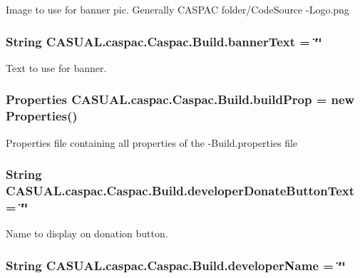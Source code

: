 Image to use for banner pic. Generally C\-A\-S\-P\-A\-C folder/\-Code\-Source -\/\-Logo.\-png \hypertarget{class_c_a_s_u_a_l_1_1caspac_1_1_caspac_1_1_build_ad52dcd748136e46978261a093f5fbb9e}{
\subsubsection[{banner\-Text}]{\setlength{\rightskip}{0pt plus 5cm}String C\-A\-S\-U\-A\-L.\-caspac.\-Caspac.\-Build.\-banner\-Text = \char`\"{}\char`\"{}}}\label{class_c_a_s_u_a_l_1_1caspac_1_1_caspac_1_1_build_ad52dcd748136e46978261a093f5fbb9e}
Text to use for banner. \hypertarget{class_c_a_s_u_a_l_1_1caspac_1_1_caspac_1_1_build_ae41e84cb3d34e8771bcbdfe5e9dbce54}{
\subsubsection[{build\-Prop}]{\setlength{\rightskip}{0pt plus 5cm}Properties C\-A\-S\-U\-A\-L.\-caspac.\-Caspac.\-Build.\-build\-Prop = new Properties()}}\label{class_c_a_s_u_a_l_1_1caspac_1_1_caspac_1_1_build_ae41e84cb3d34e8771bcbdfe5e9dbce54}
Properties file containing all properties of the -\/\-Build.\-properties file \hypertarget{class_c_a_s_u_a_l_1_1caspac_1_1_caspac_1_1_build_adb3e52b35bc8d27e65047c0e6a0b55d4}{
\subsubsection[{developer\-Donate\-Button\-Text}]{\setlength{\rightskip}{0pt plus 5cm}String C\-A\-S\-U\-A\-L.\-caspac.\-Caspac.\-Build.\-developer\-Donate\-Button\-Text = \char`\"{}\char`\"{}}}\label{class_c_a_s_u_a_l_1_1caspac_1_1_caspac_1_1_build_adb3e52b35bc8d27e65047c0e6a0b55d4}
Name to display on donation button. \hypertarget{class_c_a_s_u_a_l_1_1caspac_1_1_caspac_1_1_build_a6508efd0a89b6a97ce5ce6fd8f09e4ac}{
\subsubsection[{developer\-Name}]{\setlength{\rightskip}{0pt plus 5cm}String C\-A\-S\-U\-A\-L.\-caspac.\-Caspac.\-Build.\-developer\-Name = \char`\"{}\char`\"{}}}\label{class_c_a_s_u_a_l_1_1caspac_1_1_caspac_1_1_build_a6508efd0a89b6a97ce5ce6fd8f09e4ac}
